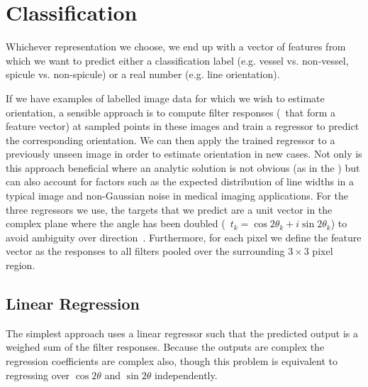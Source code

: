 \section{Classification}
Whichever representation we choose, we end up with a vector of features from which we want to predict either a classification label (e.g. vessel vs. non-vessel, spicule vs. non-spicule) or a real number (e.g. line orientation).


If we have examples of labelled image data for which we wish to estimate orientation, a sensible approach is to compute filter responses (\ie~that form a feature vector) at sampled points in these images and train a regressor to predict the corresponding orientation. We can then apply the trained regressor to a previously unseen image in order to estimate orientation in new cases. Not only is this approach beneficial where an analytic solution is not obvious (as in the \dtcwt) but can also account for factors such as the expected distribution of line widths in a typical image and non-Gaussian noise in medical imaging applications. For the three regressors we use, the targets that we predict are a unit vector in the complex plane where the angle has been doubled (\ie~$t_k = \cos 2\theta_k + i\sin 2\theta_k$) to avoid ambiguity over direction~\cite{Mardia_Jupp_00}. Furthermore, for each pixel we define the feature vector as the responses to all filters pooled over the surrounding $3{\times}3$ pixel region.


\subsection{Linear Regression}
\label{s:learning_linear}
The simplest approach uses a linear regressor such that the predicted output is a weighed sum of the filter responses. Because the outputs are complex the regression coefficients are complex also, though this problem is equivalent to regressing over $\cos 2\theta$ and $\sin 2\theta$ independently.



